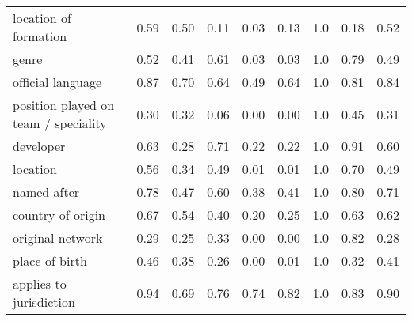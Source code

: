 \begin{table*}[t]
{\begin{tabular}{lrrrrrrrr}
                location of formation &                      0.59 &                        0.50 &      0.11 &            0.03 &                 0.13 &                  1.0 &                 0.18 &         0.52 \\
                                genre &                      0.52 &                        0.41 &      0.61 &            0.03 &                 0.03 &                  1.0 &                 0.79 &         0.49 \\
                    official language &                      0.87 &                        0.70 &      0.64 &            0.49 &                 0.64 &                  1.0 &                 0.81 &         0.84 \\
 position played on team / speciality &                      0.30 &                        0.32 &      0.06 &            0.00 &                 0.00 &                  1.0 &                 0.45 &         0.31 \\
                            developer &                      0.63 &                        0.28 &      0.71 &            0.22 &                 0.22 &                  1.0 &                 0.91 &         0.60 \\
                             location &                      0.56 &                        0.34 &      0.49 &            0.01 &                 0.01 &                  1.0 &                 0.70 &         0.49 \\
                          named after &                      0.78 &                        0.47 &      0.60 &            0.38 &                 0.41 &                  1.0 &                 0.80 &         0.71 \\
                    country of origin &                      0.67 &                        0.54 &      0.40 &            0.20 &                 0.25 &                  1.0 &                 0.63 &         0.62 \\
                     original network &                      0.29 &                        0.25 &      0.33 &            0.00 &                 0.00 &                  1.0 &                 0.82 &         0.28 \\
                       place of birth &                      0.46 &                        0.38 &      0.26 &            0.00 &                 0.01 &                  1.0 &                 0.32 &         0.41 \\
              applies to jurisdiction &                      0.94 &                        0.69 &      0.76 &            0.74 &                 0.82 &                  1.0 &                 0.83 &         0.90 \\

\end{tabular}}
\end{table*}
